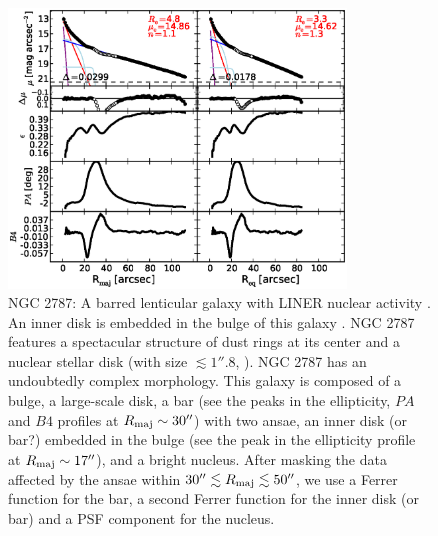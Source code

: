 \documentclass[preprint2]{emulateapj}
\newcommand{\fitfigurewidth}{0.8\textwidth}
\begin{document}
  \begin{figure}[h]
  \begin{center}
  \includegraphics[width=\fitfigurewidth]{n2787_1Dfit.eps}
  \caption{NGC 2787: 
  A barred lenticular galaxy with LINER nuclear activity \citep{veroncettyveron2006}.
  An inner disk is embedded in the bulge of this galaxy \citep{erwin2003n2787}.
  NGC 2787 features a spectacular structure of dust rings at its center \citep{erwinsparke2003}
  and a nuclear stellar disk (with size $\lesssim 1''.8$, \citealt{ledo2010}).
  NGC 2787 has an undoubtedly complex morphology. 
  This galaxy is composed of a bulge, a large-scale disk, a bar (see the peaks in the ellipticity, $PA$ and $B4$ profiles
  at $R_{\rm maj} \sim 30''$) with two ansae, an inner disk (or bar?) embedded in the bulge (see the peak in the ellipticity profile
  at $R_{\rm maj} \sim 17''$), and a bright nucleus.
  After masking the data affected by the ansae within $30'' \lesssim R_{\rm maj} \lesssim 50''$,
  we use a Ferrer function for the bar, a second Ferrer function for the inner disk (or bar) 
  and a PSF component for the nucleus. 
}
\end{center}
\end{figure}
\end{document}
